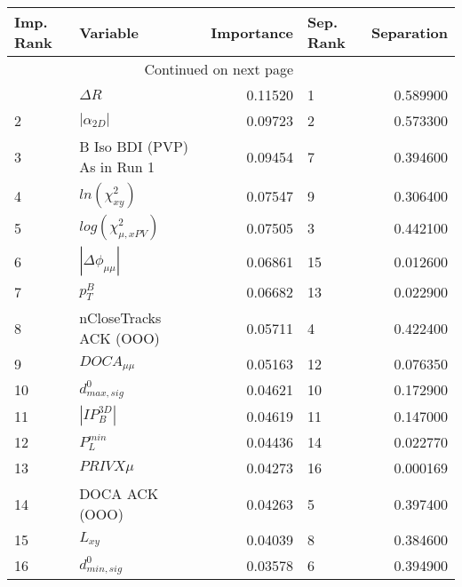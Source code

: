 \usepackage{lscape}

\begin{landscape}
\begin{longtable}{llrlr}
\toprule
Imp. Rank &                     Variable &  Importance & Sep. Rank &  Separation \\
\midrule
\endhead
\midrule
\multicolumn{3}{r}{{Continued on next page}} \\
\midrule
\endfoot

\bottomrule
\endlastfoot
        1 &                   $\Delta R$ &     0.11520 &         1 &    0.589900 \\
        2 &              $|\alpha_{2D}|$ &     0.09723 &         2 &    0.573300 \\
        3 &  B Iso BDI (PVP) As in Run 1 &     0.09454 &         7 &    0.394600 \\
        4 &          $ln(\chi^{2}_{xy})$ &     0.07547 &         9 &    0.306400 \\
        5 &    $log(\chi^{2}_{\mu,xPV})$ &     0.07505 &         3 &    0.442100 \\
        6 &     $|\Delta \phi_{\mu\mu}|$ &     0.06861 &        15 &    0.012600 \\
        7 &                    $p^B_{T}$ &     0.06682 &        13 &    0.022900 \\
        8 &       nCloseTracks ACK (OOO) &     0.05711 &         4 &    0.422400 \\
        9 &              $DOCA_{\mu\mu}$ &     0.05163 &        12 &    0.076350 \\
       10 &             $d^0_{max, sig}$ &     0.04621 &        10 &    0.172900 \\
       11 &              $|IP_{B}^{3D}|$ &     0.04619 &        11 &    0.147000 \\
       12 &                $P^{min}_{L}$ &     0.04436 &        14 &    0.022770 \\
       13 &                   $PRIVX\mu$ &     0.04273 &        16 &    0.000169 \\
       14 &               DOCA ACK (OOO) &     0.04263 &         5 &    0.397400 \\
       15 &                     $L_{xy}$ &     0.04039 &         8 &    0.384600 \\
       16 &             $d^0_{min, sig}$ &     0.03578 &         6 &    0.394900 \\
\end{longtable}

\end{landscape}
